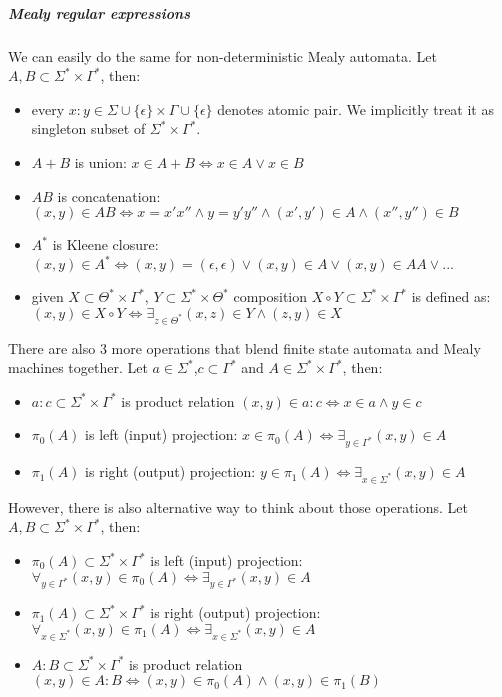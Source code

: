 \documentclass[12pt]{article}
\begin{document}
\subparagraph{Mealy regular expressions}
We can easily do the same for non-deterministic Mealy automata. Let $A,B \subset \Sigma^* \times \Gamma^*$, then:
\begin{itemize}
	\item every $x:y \in \Sigma\cup\{\epsilon\} \times \Gamma\cup\{\epsilon\}$ denotes atomic pair. We implicitly treat it as singleton subset of $\Sigma^* \times \Gamma^*$.
	\item $A + B$ is union: $x \in A + B  \iff x \in A \vee x \in B$
\item $AB$ is concatenation: $(x,y)\in AB \iff x=x'x'' \wedge y=y'y'' \wedge (x',y') \in A \wedge (x'',y'') \in B$
\item $A^*$ is Kleene closure: $(x,y)\in A^* \iff (x,y) = (\epsilon,\epsilon) \vee (x,y) \in A \vee (x,y) \in AA \vee ...$
\item given $X\subset \Theta^*\times\Gamma^*$, $Y\subset \Sigma^*\times\Theta^*$  composition $X \circ Y \subset \Sigma^* \times \Gamma^*$ is defined as: $(x,y)\in X \circ Y \iff \exists_{z\in\Theta^*} (x,z)\in Y \wedge (z,y) \in X$
\end{itemize}  
There are also 3 more operations that blend finite state automata and Mealy machines together. Let $a\in\Sigma^*$,$c\subset \Gamma^*$ and $A \in \Sigma^* \times \Gamma^*$, then:
\begin{itemize}
	\item $a:c \subset \Sigma^* \times \Gamma^*$ is product relation $(x,y)\in a:c \iff x\in a\wedge y\in c $
	\item $\pi_0(A)$ is left (input) projection: $x \in \pi_0(A) \iff \exists_{y\in\Gamma^*} (x,y) \in A$
	\item $\pi_1(A)$ is right (output) projection: $y \in \pi_1(A) \iff \exists_{x\in\Sigma^*} (x,y) \in A$
\end{itemize}
However, there is also alternative way to think about those operations. Let $A,B \subset \Sigma^* \times \Gamma^*$, then:
 \begin{itemize}
 	\item $\pi_0(A) \subset \Sigma^* \times \Gamma^*$ is left (input) projection: $\forall_{y\in\Gamma^*} (x,y) \in \pi_0(A) \iff \exists_{y\in\Gamma^*} (x,y) \in A$
 	\item $\pi_1(A) \subset \Sigma^* \times \Gamma^*$ is right (output) projection: $\forall_{x\in\Sigma^*} (x,y) \in \pi_1(A) \iff \exists_{x\in\Sigma^*} (x,y) \in A$
 	\item $A:B \subset \Sigma^* \times \Gamma^*$ is product relation $(x,y)\in A:B \iff (x,y)\in \pi_0(A)\wedge (x,y)\in \pi_1(B)$
 \end{itemize}
\end{document}
